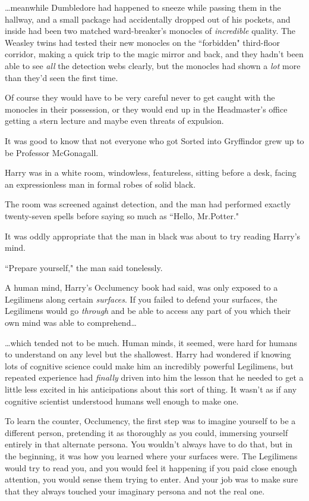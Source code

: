 {\ldots}meanwhile Dumbledore had happened to sneeze while passing them in the hallway, and a small package had accidentally dropped out of his pockets, and inside had been two matched ward-breaker's monocles of \emph{incredible} quality. The Weasley twins had tested their new monocles on the ``forbidden" third-floor corridor, making a quick trip to the magic mirror and back, and they hadn't been able to see \emph{all} the detection webs clearly, but the monocles had shown a \emph{lot} more than they'd seen the first time.

Of course they would have to be very careful never to get caught with the monocles in their possession, or they would end up in the Headmaster's office getting a stern lecture and maybe even threats of expulsion.

It was good to know that not everyone who got Sorted into Gryffindor grew up to be Professor McGonagall.

\later

Harry was in a white room, windowless, featureless, sitting before a desk, facing an expressionless man in formal robes of solid black.

The room was screened against detection, and the man had performed exactly twenty-seven spells before saying so much as ``Hello, Mr.\?Potter."

It was oddly appropriate that the man in black was about to try reading Harry's mind.

``Prepare yourself," the man said tonelessly.

A human mind, Harry's Occlumency book had said, was only exposed to a Legilimens along certain \emph{surfaces}. If you failed to defend your surfaces, the Legilimens would go \emph{through} and be able to access any part of you which their own mind was able to comprehend{\ldots}

{\ldots}which tended not to be much. Human minds, it seemed, were hard for humans to understand on any level but the shallowest. Harry had wondered if knowing lots of cognitive science could make him an incredibly powerful Legilimens, but repeated experience had \emph{finally} driven into him the lesson that he needed to get a little less excited in his anticipations about this sort of thing. It wasn't as if any cognitive scientist understood humans well enough to make one.

To learn the counter, Occlumency, the first step was to imagine yourself to be a different person, pretending it as thoroughly as you could, immersing yourself entirely in that alternate persona. You wouldn't always have to do that, but in the beginning, it was how you learned where your surfaces were. The Legilimens would try to read you, and you would feel it happening if you paid close enough attention, you would sense them trying to enter. And your job was to make sure that they always touched your imaginary persona and not the real one.


